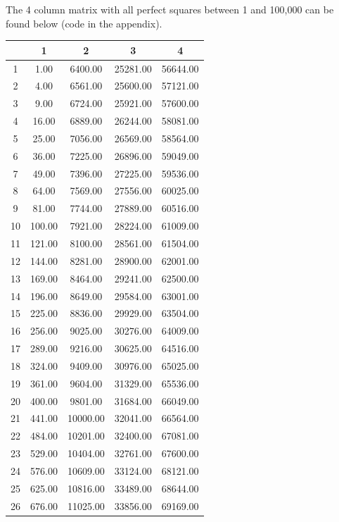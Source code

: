 \documentclass{amsart}
\begin{document}
The 4 column matrix with all perfect squares between 1 and 100,000
can be found below (code in the appendix).

\begin{center}
\begin{longtable}{|c|c|c|c|c|}
  \hline
 & 1 & 2 & 3 & 4 \\
  \hline
1 & 1.00 & 6400.00 & 25281.00 & 56644.00 \\
  2 & 4.00 & 6561.00 & 25600.00 & 57121.00 \\
  3 & 9.00 & 6724.00 & 25921.00 & 57600.00 \\
  4 & 16.00 & 6889.00 & 26244.00 & 58081.00 \\
  5 & 25.00 & 7056.00 & 26569.00 & 58564.00 \\
  6 & 36.00 & 7225.00 & 26896.00 & 59049.00 \\
  7 & 49.00 & 7396.00 & 27225.00 & 59536.00 \\
  8 & 64.00 & 7569.00 & 27556.00 & 60025.00 \\
  9 & 81.00 & 7744.00 & 27889.00 & 60516.00 \\
  10 & 100.00 & 7921.00 & 28224.00 & 61009.00 \\
  11 & 121.00 & 8100.00 & 28561.00 & 61504.00 \\
  12 & 144.00 & 8281.00 & 28900.00 & 62001.00 \\
  13 & 169.00 & 8464.00 & 29241.00 & 62500.00 \\
  14 & 196.00 & 8649.00 & 29584.00 & 63001.00 \\
  15 & 225.00 & 8836.00 & 29929.00 & 63504.00 \\
  16 & 256.00 & 9025.00 & 30276.00 & 64009.00 \\
  17 & 289.00 & 9216.00 & 30625.00 & 64516.00 \\
  18 & 324.00 & 9409.00 & 30976.00 & 65025.00 \\
  19 & 361.00 & 9604.00 & 31329.00 & 65536.00 \\
  20 & 400.00 & 9801.00 & 31684.00 & 66049.00 \\
  21 & 441.00 & 10000.00 & 32041.00 & 66564.00 \\
  22 & 484.00 & 10201.00 & 32400.00 & 67081.00 \\
  23 & 529.00 & 10404.00 & 32761.00 & 67600.00 \\
  24 & 576.00 & 10609.00 & 33124.00 & 68121.00 \\
  25 & 625.00 & 10816.00 & 33489.00 & 68644.00 \\
  26 & 676.00 & 11025.00 & 33856.00 & 69169.00 \\

\end{longtable}
\end{center}
\end{document}
